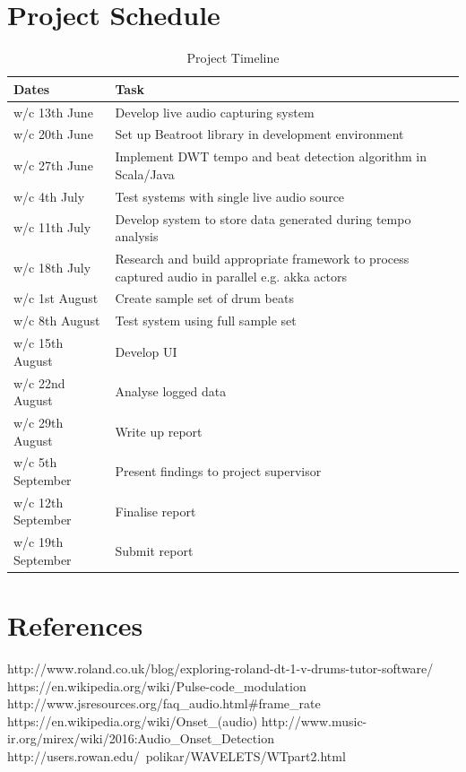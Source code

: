 \documentclass[a4paper, 11pt]{article}
\begin{document}
\maketitle{} 
\section{Project Schedule}

\begin{table}[]
\caption{Project Timeline} 
\centering
\begin{tabular}{|p{4cm}|p{8cm}|}
 \hline
\textbf{Dates} & \textbf{Task}\\ [0.5ex]
\hline 
w/c 13th June & Develop live audio capturing system\\
\hline 
w/c 20th June & Set up Beatroot library in development environment\\
\hline 
w/c 27th June & Implement DWT tempo and beat detection algorithm in Scala/Java\\
\hline 
w/c 4th July & Test systems with single live audio source\\
\hline 
w/c 11th July & Develop system to store data generated during tempo analysis\\
\hline 
w/c 18th July & Research and build appropriate framework to process captured audio in parallel e.g. akka actors\\
\hline 
w/c 1st August & Create sample set of drum beats\\
\hline 
w/c 8th August & Test system using full sample set\\
\hline 
w/c 15th August & Develop UI\\
\hline 
w/c 22nd August & Analyse logged data\\
\hline 
w/c 29th August & Write up report\\
\hline 
w/c 5th September & Present findings to project supervisor\\
\hline 
w/c 12th September & Finalise report\\
\hline 
w/c 19th September & Submit report\\
\hline
\end{tabular}
\end{table}

\maketitle{} 
\section{References}
http://www.roland.co.uk/blog/exploring-roland-dt-1-v-drums-tutor-software/
https://en.wikipedia.org/wiki/Pulse-code\_modulation
http://www.jsresources.org/faq\_audio.html\#frame\_rate
https://en.wikipedia.org/wiki/Onset\_(audio)
http://www.music-ir.org/mirex/wiki/2016:Audio\_Onset\_Detection
http://users.rowan.edu/~polikar/WAVELETS/WTpart2.html
\end{document}
